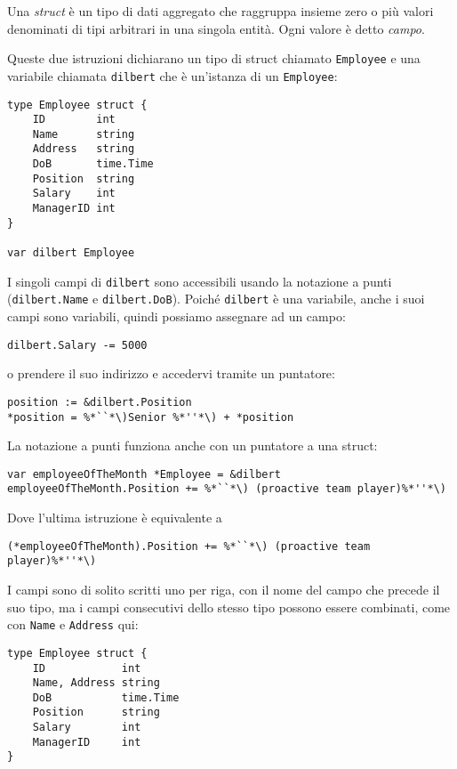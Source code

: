 %
Una \textit{struct} è un tipo di dati aggregato che raggruppa insieme zero o più valori denominati di tipi arbitrari in una singola entità.
Ogni valore è detto \textit{campo}.

Queste due istruzioni dichiarano un tipo di struct chiamato \verb|Employee| e una variabile chiamata \verb|dilbert| che è un'istanza di un \verb|Employee|:
\begin{lstlisting}[frame=single, label={lst:lstlisting3-4.1}]
type Employee struct {
    ID 	      int
    Name      string
    Address   string
    DoB       time.Time
    Position  string
    Salary    int
    ManagerID int
}

var dilbert Employee
\end{lstlisting}
I singoli campi di \verb|dilbert| sono accessibili usando la notazione a punti (\verb|dilbert.Name| e \verb|dilbert.DoB|).
Poiché \verb|dilbert| è una variabile, anche i suoi campi sono variabili, quindi possiamo assegnare ad un campo:
\begin{lstlisting}[frame=single, label={lst:lstlisting3-4.2}]
dilbert.Salary -= 5000
\end{lstlisting}
o prendere il suo indirizzo e accedervi tramite un puntatore:
\begin{lstlisting}[frame=single, label={lst:lstlisting3-4.3}]
position := &dilbert.Position
*position = %*``*\)Senior %*''*\) + *position
\end{lstlisting}
La notazione a punti funziona anche con un puntatore a una struct:
\begin{lstlisting}[frame=single, label={lst:lstlisting3-4.4}]
var employeeOfTheMonth *Employee = &dilbert
employeeOfTheMonth.Position += %*``*\) (proactive team player)%*''*\)
\end{lstlisting}
Dove l'ultima istruzione è equivalente a
\begin{lstlisting}[frame=single, label={lst:lstlisting3-4.5}]
(*employeeOfTheMonth).Position += %*``*\) (proactive team player)%*''*\)
\end{lstlisting}
I campi sono di solito scritti uno per riga, con il nome del campo che precede il suo tipo, ma i campi consecutivi dello stesso tipo possono essere combinati, come con \verb|Name| e \verb|Address| qui:
\begin{lstlisting}[frame=single, label={lst:lstlisting3-4.6}]
type Employee struct {
    ID            int
    Name, Address string
    DoB           time.Time
    Position      string
    Salary        int
    ManagerID     int
}
\end{lstlisting}
